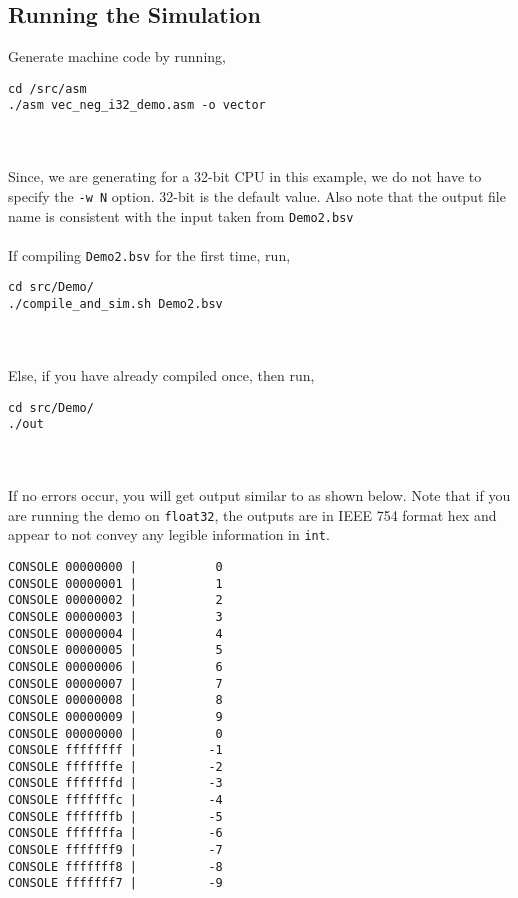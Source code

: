 \begin{paper}
\section*{Running the Simulation\sdot}
Generate machine code by running, 
\begin{verbatim}
cd /src/asm
./asm vec_neg_i32_demo.asm -o vector
\end{verbatim}\\\\
\nointend Since, we are generating for a 32-bit CPU in this example, we do not have to specify the \texttt{-w N} option. 32-bit is the default value. Also note that the output file name is consistent with the input taken from \texttt{Demo2.bsv}\\\\
\nointend If compiling \texttt{Demo2.bsv} for the first time, run,
\begin{verbatim}
cd src/Demo/
./compile_and_sim.sh Demo2.bsv 
\end{verbatim}\\\\
\nointend Else, if you have already compiled once, then run,
\begin{verbatim}
cd src/Demo/
./out
\end{verbatim}\\\\
\nointend If no errors occur, you will get output similar to as shown below. Note that if you are running the demo on \texttt{float32}, the outputs are in IEEE 754 format hex and appear to not convey any legible information in \texttt{int}.
\begin{verbatim}
CONSOLE 00000000 |           0
CONSOLE 00000001 |           1
CONSOLE 00000002 |           2
CONSOLE 00000003 |           3
CONSOLE 00000004 |           4
CONSOLE 00000005 |           5
CONSOLE 00000006 |           6
CONSOLE 00000007 |           7
CONSOLE 00000008 |           8
CONSOLE 00000009 |           9
CONSOLE 00000000 |           0
CONSOLE ffffffff |          -1
CONSOLE fffffffe |          -2
CONSOLE fffffffd |          -3
CONSOLE fffffffc |          -4
CONSOLE fffffffb |          -5
CONSOLE fffffffa |          -6
CONSOLE fffffff9 |          -7
CONSOLE fffffff8 |          -8
CONSOLE fffffff7 |          -9

\end{verbatim}\\

\end{paper}


